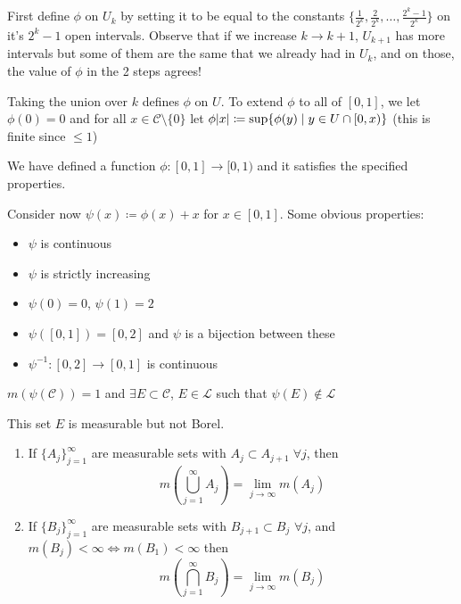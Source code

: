 First define $\phi$ on $U_k$ by setting it to be equal to the constants $\{ \frac{1}{2^k}, \frac{2}{2^k}, \hdots, \frac{2^k - 1}{2^k} \}$ on it's $2^k -1$ open intervals.
Observe that if we increase $k \rightarrow k+1$, $U_{k+1}$ has more intervals but some of them are the same that we already had in $U_k$, and on those, the value of $\phi$ in the 2 steps agrees!

Taking the union over $k$ defines $\phi$ on $U$.
To extend $\phi$ to all of $[0,1]$, we let $\phi(0) = 0$ and for all $x \in \mathcal{C} \setminus \{ 0 \}$ let $\phi \lvert x\rvert \coloneqq \sup \{ \phi(y) \mid y \in U \cap [0,x) \}$ (this is finite since $ \leq 1$)

We have defined a function $\phi: [0,1] \rightarrow [0,1)$ and it satisfies the specified properties.

Consider now $\psi (x) \coloneqq \phi(x) + x$ for $x \in [0,1]$.
Some obvious properties:
\begin{itemize}
    \item $\psi$ is continuous
    \item $\psi$ is strictly increasing
    \item $\psi(0) = 0$, $\psi(1) = 2$
    \item $\psi([0,1]) = [0,2]$ and $\psi$ is a bijection between these
    \item $\psi^{-1}: [0,2] \rightarrow [0,1]$ is continuous
\end{itemize}

\begin{prop}
    $m(\psi(\mathcal{C})) = 1$ and $\exists E \subset \mathcal{C}$, $E \in \mathcal{L}$ such that $\psi(E) \notin \mathcal{L}$
\end{prop}

\begin{*corollary}
    This set $E$ is measurable but not Borel.
\end{*corollary}

\begin{prop}

    \begin{enumerate}
        \item If $\{ A_j \}_{j=1}^{\infty}$ are measurable sets with $A_j \subset A_{j+1} \; \forall j$, then
        \[
            m\left( \bigcup_{j=1}^{\infty} A_j \right) = \lim_{j \rightarrow \infty} m(A_j)
        \]
        \item  If $\{ B_j \}_{j=1}^{\infty}$ are measurable sets with $B_{j+1} \subset B_j$ $\forall j$, and $m(B_j) < \infty \iff m(B_1) < \infty$ then
        \[
            m \left( \bigcap_{j=1}^{\infty} B_j \right) = \lim_{j \rightarrow \infty} m(B_j)
        \]
    \end{enumerate}

\end{prop}

